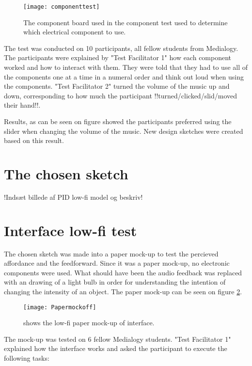 \begin{figure}[!h] 
\centering
\texttt{[image: componenttest]}
\caption{\label{fig:componenttest} The component board used in the component test used to determine which electrical component to use.}
\end{figure}

The test was conducted on 10 participants, all fellow students from Medialogy. The participants were explained by "Test Facilitator 1" how each component worked and how to interact with them. They were told that they had to use all of the components one at a time in a numeral order and think out loud when using the components. "Test Facilitator 2" turned the volume of the music up and down, corresponding to how much the participant !!turned/clicked/slid/moved their hand!!.

Results, as can be seen on figure  showed the participants preferred using the slider when changing the volume of the music. New design sketches were created based on this result.


\section{The chosen sketch}
!Indsæt billede af PID low-fi model og beskriv!

\section{Interface low-fi test}
The chosen sketch was made into a paper mock-up to test the  percieved affordance and the  feedforward. Since it was a paper mock-up, no electronic components were used. What should have been the audio feedback was replaced with an drawing of a light bulb in order for understanding the intention of changing the intensity of an object. The paper mock-up can be seen on figure \ref{fig:Papermockoff}.

\begin{figure}[!h] 
\centering
\texttt{[image: Papermockoff]}
\caption{\label{fig:Papermockoff} shows the low-fi paper mock-up of interface.}
\end{figure}

The mock-up was tested on 6 fellow Medialogy students. "Test Facilitator 1" explained how the interface works and asked the participant to execute the following tasks:

